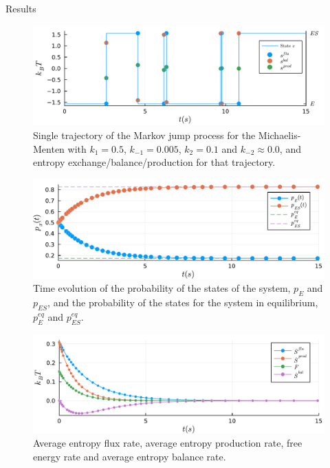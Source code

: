 \documentclass[final]{beamer}
\newlength{\colwidth}
\begin{document}
\begin{frame}[t]
\begin{columns}[t]
\begin{column}{\colwidth}
\begin{block}{Results}
\begin{figure}
\begin{center}
%
\includegraphics[scale=1.2]{graphics/f8.pdf}
\end{center}
\caption{\justifying Single trajectory of the Markov jump process for the Michaelis-Menten with $k_{1} = 0.5$, $k_{-1} = 0.005$, $k_{2} = 0.1$ and $k_{-2} \approx 0.0$, and entropy exchange/balance/production for that trajectory.}\label{fig transition}
\end{figure}
\begin{figure}
\begin{center}
%
\includegraphics[scale=1.2]{graphics/f1.pdf}
\end{center}
\label{fig 2-state-system}
\caption{\justifying  Time evolution of the probability of the states of the system, $p_E$ and $p_{ES}$, and the probability of the states for the system in equilibrium, $p_E^{eq}$ and $p_{ES}^{eq}$.}
\end{figure}

\begin{figure}
\begin{center}
%
\includegraphics[scale=1.2]{graphics/f2.pdf}
\end{center}
\label{fig 2-state-system}
\caption{\justifying Average entropy flux rate, average entropy production rate, free energy rate and average entropy balance rate.}
\end{figure}


\end{block}
\end{column}
\end{columns}
\end{frame}
\end{document}
